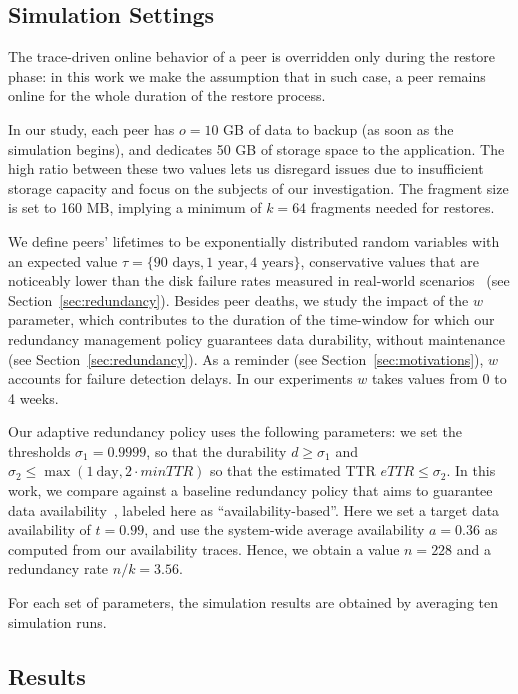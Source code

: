 \subsection{Simulation Settings}
The trace-driven online behavior of a peer is overridden only during
the restore phase: in this work we make the assumption that in such
case, a peer remains online for the whole duration of the restore
process.

In our study, each peer has $o=10$ GB of data to backup (as soon as
the simulation begins), and dedicates 50 GB of storage space to the
application. The high ratio between these two values lets us disregard
issues due to insufficient storage capacity and focus on the subjects
of our investigation. The fragment size is set to 160 MB, implying a
minimum of $k=64$ fragments needed for restores.

We define peers' lifetimes to be exponentially distributed random
variables with an expected value $\tau = \{90 \text{ days}, 1
\text{ year}, 4 \text{ years} \}$, conservative values that are
noticeably lower than the disk failure rates measured in real-world
scenarios~\cite{fast07} (see Section~\ref{sec:redundancy}).  Besides peer
deaths, we study the impact of the $w$ parameter, which contributes to
the duration of the time-window for which our redundancy management
policy guarantees data durability, without maintenance (see
Section~\ref{sec:redundancy}).  As a reminder (see
Section~\ref{sec:motivations}), $w$ accounts for failure detection
delays. In our experiments $w$ takes values from 0 to 4 weeks.

Our adaptive redundancy policy uses the following parameters: we set
the thresholds $\sigma_1 = 0.9999$, so that the durability $d \geq
\sigma_1$ and $\sigma_2 \leq \max\left(1~\mathrm{day}, 2 \cdot
  minTTR\right)$ so that the estimated TTR $eTTR \leq \sigma_2$. In
this work, we compare against a baseline redundancy policy that aims
to guarantee data availability~\cite{Kiran04totalrecall}, labeled here
as ``availability-based''. Here we set a target data availability of
$t=0.99$, and use the system-wide average availability $a=0.36$ as
computed from our availability traces. Hence, we obtain a value
$n=228$ and a redundancy rate $n / k = 3.56$.

For each set of parameters, the simulation results are obtained by
averaging ten simulation runs.

\subsection{Results}
\label{sec:results}

